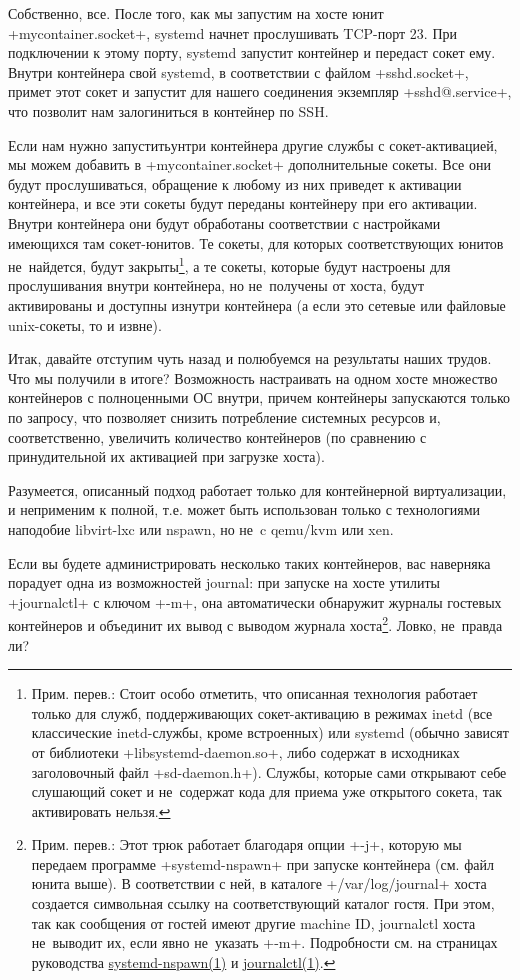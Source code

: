 \documentclass[10pt,oneside,a4paper]{article}
\begin{document}
Собственно, все. После того, как мы запустим на хосте юнит +mycontainer.socket+,
systemd начнет прослушивать TCP-порт 23. При подключении к этому порту, systemd
запустит контейнер и передаст сокет ему. Внутри контейнера свой systemd, в
соответствии с файлом +sshd.socket+, примет этот сокет и запустит для нашего
соединения экземпляр +sshd@.service+, что позволит нам залогиниться в контейнер
по SSH.

Если нам нужно запуститьунтри контейнера другие службы с сокет-активацией, мы
можем добавить в +mycontainer.socket+ дополнительные сокеты. Все они будут
прослушиваться, обращение к любому из них приведет к активации контейнера, и все
эти сокеты будут переданы контейнеру при его активации. Внутри контейнера они
будут обработаны соответствии с настройками имеющихся там сокет-юнитов. Те
сокеты, для которых соответствующих юнитов не~найдется, будут
закрыты\footnote{Прим. перев.: Стоит особо отметить, что описанная технология
работает только для служб, поддерживающих сокет-активацию в режимах inetd (все
классические inetd-службы, кроме встроенных) или systemd (обычно зависят от
библиотеки +libsystemd-daemon.so+, либо содержат в исходниках заголовочный файл
+sd-daemon.h+). Службы, которые сами открывают себе слушающий сокет и
не~содержат кода для приема уже открытого сокета, так активировать нельзя.}, а
те сокеты, которые будут настроены для прослушивания внутри контейнера, но
не~получены от хоста, будут активированы и доступны изнутри контейнера (а если
это сетевые или файловые unix-сокеты, то и извне).

Итак, давайте отступим чуть назад и полюбуемся на результаты наших трудов. Что
мы получили в итоге? Возможность настраивать на одном хосте множество
контейнеров с полноценными ОС внутри, причем контейнеры запускаются только по
запросу, что позволяет снизить потребление системных ресурсов и, соответственно,
увеличить количество контейнеров (по сравнению с принудительной их активацией
при загрузке хоста).

Разумеется, описанный подход работает только для контейнерной виртуализации, и
неприменим к полной, т.е. может быть использован только с технологиями наподобие
libvirt-lxc или nspawn, но не~c qemu/kvm или xen.

Если вы будете администрировать несколько таких контейнеров, вас наверняка
порадует одна из возможностей journal: при запуске на хосте утилиты +journalctl+
с ключом +-m+, она автоматически обнаружит журналы гостевых контейнеров и
объединит их вывод с выводом журнала хоста\footnote{\label{ftn:jrnmerge}Прим.
перев.: Этот трюк работает благодаря опции +-j+, которую мы передаем программе
+systemd-nspawn+ при запуске контейнера (см. файл юнита выше). В соответствии с
ней, в каталоге +/var/log/journal+ хоста создается символьная ссылку на
соответствующий каталог гостя. При этом, так как сообщения от гостей имеют
другие machine ID, journalctl хоста не~выводит их, если явно не~указать +-m+.
Подробности см. на страницах руководства
\href{http://www.freedesktop.org/software/systemd/man/systemd-nspawn.html}{systemd-nspawn(1)}
и
\href{http://www.freedesktop.org/software/systemd/man/journalctl.html}{journalctl(1)}.}.
Ловко, не~правда ли?
\end{document}
